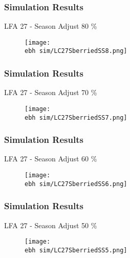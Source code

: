 \documentclass{beamer}
\newcommand{\ebh}{\string~/bio.data/bio.lobster/figures/LFA2733Framework2018/} %
\begin{document}
\begin{frame}
\frametitle{Simulation Results}
LFA 27 - Season Adjust 80 \%
\begin{figure}
        \begin{center}
            \texttt{[image: \\ebh sim/LC27SberriedSS8.png]}
        \end{center}
    \end{figure}
\end{frame}


\begin{frame}
\frametitle{Simulation Results}
LFA 27 - Season Adjust 70 \%
\begin{figure}
        \begin{center}
            \texttt{[image: \\ebh sim/LC27SberriedSS7.png]}
        \end{center}
    \end{figure}
\end{frame}


\begin{frame}
\frametitle{Simulation Results}
LFA 27 - Season Adjust 60 \%
\begin{figure}
        \begin{center}
            \texttt{[image: \\ebh sim/LC27SberriedSS6.png]}
        \end{center}
    \end{figure}
\end{frame}


\begin{frame}
\frametitle{Simulation Results}
LFA 27 - Season Adjust 50 \%
\begin{figure}
        \begin{center}
            \texttt{[image: \\ebh sim/LC27SberriedSS5.png]}
        \end{center}
    \end{figure}
\end{frame}
\end{document}
